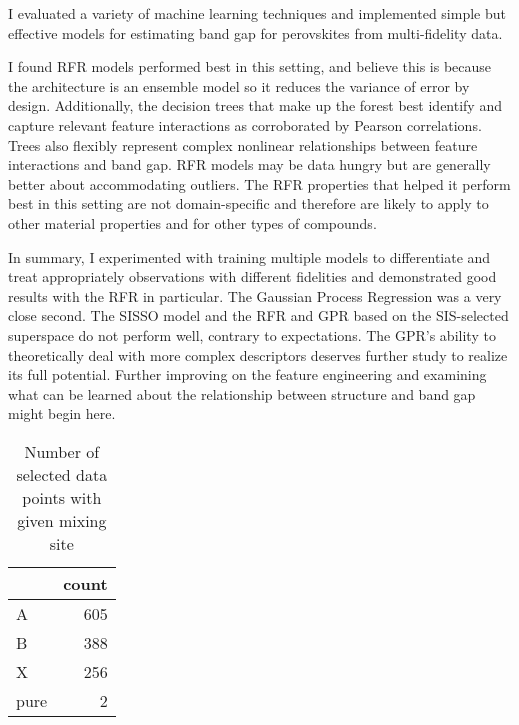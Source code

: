 I evaluated a variety of machine learning techniques and implemented simple but effective models for estimating band gap for perovskites from multi-fidelity data.

I found RFR models performed best in this setting, and believe this is because the architecture is an ensemble model so it reduces the variance of error by design.
Additionally, the decision trees that make up the forest best identify and capture relevant feature interactions as corroborated by Pearson correlations.
Trees also flexibly represent complex nonlinear relationships between feature interactions and band gap.
RFR models may be data hungry but are generally better about accommodating outliers.
The RFR properties that helped it perform best in this setting are not domain-specific and therefore are likely to apply to other material properties and for other types of compounds.

In summary, I experimented with training multiple models to differentiate and treat appropriately observations with different fidelities and demonstrated good results with the RFR in particular.
The Gaussian Process Regression was a very close second.
The SISSO model and the RFR and GPR based on the SIS-selected superspace do not perform well, contrary to expectations.
The GPR’s ability to theoretically deal with more complex descriptors deserves further study to realize its full potential.
Further improving on the feature engineering and examining what can be learned about the relationship between structure and band gap might begin here.

 
\begin{table}[htbp]
\caption{\label{tbl:mixscreen} Number of selected data points with given mixing site}
\centering
\begin{tabular}{lr}
 & count\\[0pt]
\hline
A & 605\\[0pt]
B & 388\\[0pt]
X & 256\\[0pt]
pure & 2\\[0pt]
\end{tabular}
\end{table}

